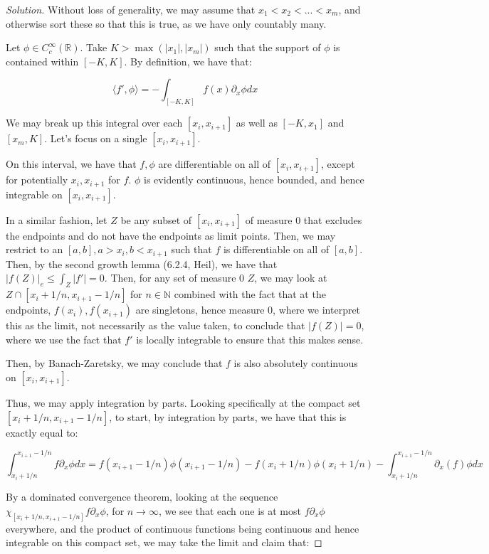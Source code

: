 \documentclass[10pt]{article}
\begin{document}
\begin{proof}[Solution]

Without loss of generality, we may assume that $x_1 < x_2 < ... < x_m$, and otherwise sort these so that this is true, as we have only countably many.

Let $\phi \in C^\infty_c(\mathbb{R})$. Take $K > \max(|x_1|, |x_m|)$ such that the support of $\phi$ is contained within $[-K, K]$. By definition, we have that:

$$ \langle f', \phi \rangle = - \int_{[-K, K]} f(x) \partial_x \phi dx $$

We may break up this integral over each $[x_i, x_{i+1}]$ as well as $[-K, x_1]$ and $[x_m, K]$. Let's focus on a single $[x_i, x_{i+1}]$.

On this interval, we have that $f, \phi$ are differentiable on all of $[x_i,x_{i+1}]$, except for potentially $x_i, x_{i+1}$ for $f$. $\phi$ is evidently continuous, hence bounded, and hence integrable on $[x_i, x_{i+1}]$.

In a similar fashion, let $Z$ be any subset of $[x_i, x_{i+1}]$ of measure 0 that excludes the endpoints and do not have the endpoints as limit points. Then, we may restrict to an $[a,b], a > x_i, b < x_{i+1}$ such that $f$ is differentiable on all of $[a,b]$. Then, by the second growth lemma (6.2.4, Heil), we have that $|f(Z)|_e \leq \int_Z |f'| = 0$. Then, for any set of measure 0 $Z$, we may look at $Z \cap [x_i + 1/n, x_{i+1} - 1/n]$ for $n \in \mathbb{N}$ combined with the fact that at the endpoints, $f(x_i), f(x_{i+1})$ are singletons, hence measure 0, where we interpret this as the limit, not necessarily as the value taken, to conclude that $|f(Z)| = 0$, where we use the fact that $f'$ is locally integrable to ensure that this makes sense.

Then, by Banach-Zaretsky, we may conclude that $f$ is also absolutely continuous on $[x_i, x_{i+1}]$.

Thus, we may apply integration by parts. Looking specifically at the compact set $[x_i + 1/n, x_{i+1} - 1/n]$, to start, by integration by parts, we have that this is exactly equal to:

$$\int_{x_i + 1/n}^{x_{i+1}-1/n} f \partial_x \phi dx =  f(x_{i+1}-1/n) \phi(x_{i+1}-1/n) - f(x_i + 1/n) \phi(x_i + 1/n) - \int_{x_i + 1/n}^{x_{i+1}-1/n} \partial_x(f) \phi dx $$

By a dominated convergence theorem, looking at the sequence $\chi_{[x_i + 1/n, x_{i+1}-1/n]} f \partial_x \phi$, for $n \to \infty$, we see that each one is at most $f \partial_x \phi$ everywhere, and the product of continuous functions being continuous and hence integrable on this compact set, we may take the limit and claim that:
 

\end{proof}
\end{document}
